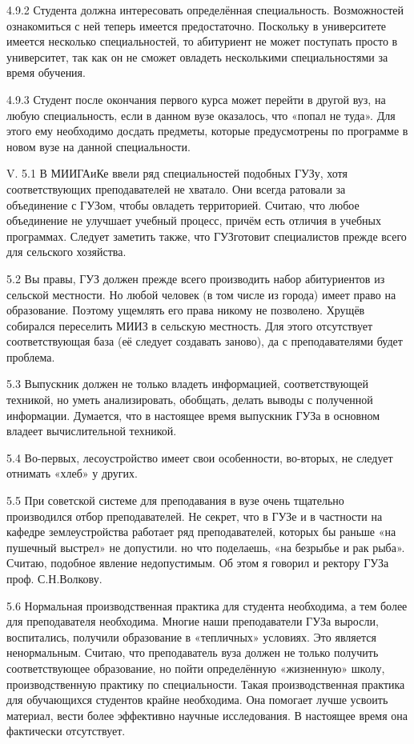 4.9.2 Студента должна интересовать определённая специальность. Возможностей ознакомиться с ней теперь имеется предостаточно. Поскольку в университете имеется несколько специальностей, то абитуриент не может поступать просто в университет, так как он не сможет овладеть несколькими специальностями за время обучения.

4.9.3 Студент после окончания первого курса может перейти в другой вуз, на любую специальность, если в данном вузе оказалось, что «попал не туда». Для этого ему необходимо досдать предметы, которые предусмотрены по программе в новом вузе на данной специальности.

V.
5.1 В МИИГАиКе ввели ряд специальностей подобных ГУЗу, хотя соответствующих преподавателей не хватало. Они всегда ратовали за объединение с ГУЗом, чтобы овладеть территорией. Считаю, что любое объединение не улучшает учебный процесс, причём есть отличия в учебных программах. Следует заметить также, что ГУЗготовит специалистов прежде всего для сельского хозяйства.

5.2 Вы правы, ГУЗ должен прежде всего производить  набор абитуриентов из сельской местности. Но любой человек (в том числе из города) имеет право на образование. Поэтому ущемлять его права никому не позволено. Хрущёв собирался переселить МИИЗ в сельскую местность. Для этого отсутствует соответствующая база (её следует создавать заново), да с преподавателями будет проблема.

5.3 Выпускник должен не только владеть информацией, соответствующей техникой, но уметь анализировать, обобщать, делать выводы с полученной информации. Думается, что в настоящее время выпускник ГУЗа в основном владеет вычислительной техникой.

5.4 Во-первых, лесоустройство имеет свои особенности, во-вторых, не следует отнимать «хлеб» у других.

5.5 При советской системе для преподавания в вузе очень тщательно производился отбор преподавателей. Не секрет, что в ГУЗе и в частности на кафедре землеустройства работает ряд преподавателей, которых бы раньше «на пушечный выстрел» не допустили. но что поделаешь, «на безрыбье и рак рыба». Считаю, подобное явление недопустимым. Об этом я говорил и ректору ГУЗа проф. С.Н.Волкову.

5.6 Нормальная производственная практика для студента необходима, а тем более для преподавателя необходима. Многие наши преподаватели ГУЗа выросли, воспитались, получили образование в «тепличных» условиях. Это является ненормальным. Считаю, что преподаватель вуза должен не только получить соответствующее образование, но пойти определённую «жизненную» школу, производственную практику по специальности. Такая производственная практика для обучающихся студентов крайне необходима. Она помогает лучше усвоить материал, вести более эффективно научные исследования. В настоящее время она фактически отсутствует.

